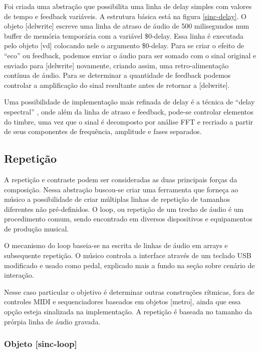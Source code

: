 \documentclass[draft]{ppgmus}
\begin{document}
Foi criada uma abstração que possibilita uma linha de delay simples com valores
de tempo e feedback variáveis. A estrutura básica está na figura \ref{sinc-delay}. O objeto 
[delwrite\texttildelow] escreve uma linha de atraso de áudio de 500 milisegundos
num buffer de memória temporária com a variável \$0-delay. Essa linha é executada
pelo objeto [vd\texttildelow] colocando nele o argumento \$0-delay. Para se criar
o efeito de ``eco'' ou feedback, podemos enviar o áudio para ser somado com o sinal
original e enviado para [delwrite\texttildelow] novamente, criando assim, uma retro-alimentação
contínua de áudio. Para se determinar a quantidade de feedback podemos controlar a 
amplificação do sinal resultante antes de retornar a [delwrite\texttildelow].


Uma possibilidade de implementação mais refinada de delay é a técnica de ``delay espectral'' \cite{guidefft}, 
onde além da linha de atraso e feedback, pode-se controlar elementos
do timbre, uma vez que o sinal é decomposto por análise FFT e recriado a partir de
seus componentes de frequência, amplitude e fases separados.

\subsection{Repetição}


A repetição e contraste podem ser consideradas as duas principais forças
da composição. Nessa abstração buscou-se criar uma ferramenta que forneça ao músico 
a possibilidade de criar múltiplas linhas de repetição de tamanhos diferentes não pré-definidos.
O loop, ou repetição de um trecho de áudio é um procedimento comum,
sendo encontrado em diversos dispositivos e equipamentos de produção musical.


O mecanismo do loop baseia-se na escrita de linhas de áudio em arrays e subsequente
repetição. O músico controla a interface através de um teclado USB modificado e 
usado como pedal, explicado mais a fundo na seção sobre cenário de interação.

Nesse caso particular o objetivo é determinar outras construções rítmicas,
fora de controles MIDI e sequenciadores baseados em objetos [metro], ainda que essa opção
esteja sinalizada na implementação. A repetição
é baseada no tamanho da prórpia linha de áudio gravada.


\subsubsection{Objeto [sinc-loop]}
\end{document}
